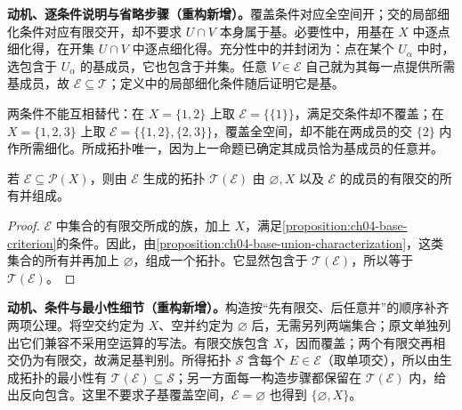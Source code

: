 \documentclass[../../main.tex]{subfiles}%
\begin{document}
\begin{remark}
\textbf{动机、逐条件说明与省略步骤（重构新增）。}覆盖条件对应全空间开；交的局部细化条件对应有限交开，却不要求 $U\cap V$ 本身属于基。必要性中，用基在 $X$ 中逐点细化得，在开集 $U\cap V$ 中逐点细化得。充分性中的并封闭为：点在某个 $U_\alpha$ 中时，选包含于 $U_\alpha$ 的基成员，它也包含于并集。任意 $V\in\mathcal E$ 自己就为其每一点提供所需基成员，故 $\mathcal E\subseteq\mathcal T$；定义中的局部细化条件随后证明它是基。

两条件不能互相替代：在 $X=\{1,2\}$ 上取 $\mathcal E=\{\{1\}\}$，满足交条件却不覆盖；在 $X=\{1,2,3\}$ 上取 $\mathcal E=\{\{1,2\},\{2,3\}\}$，覆盖全空间，却不能在两成员的交 $\{2\}$ 内作所需细化。所成拓扑唯一，因为上一命题已确定其成员恰为基成员的任意并。
\end{remark}
\begin{proposition}\label{proposition:ch04-subbase-construction}
若 $\mathcal E\subseteq\mathscr P(X)$，则由 $\mathcal E$ 生成的拓扑 $\mathcal T(\mathcal E)$ 由 $\varnothing,X$ 以及 $\mathcal E$ 的成员的有限交的所有并组成。
\end{proposition}
\begin{proof}
$\mathcal E$ 中集合的有限交所成的族，加上 $X$，满足\cref{proposition:ch04-base-criterion}的条件。因此，由\cref{proposition:ch04-base-union-characterization}，这类集合的所有并再加上 $\varnothing$，组成一个拓扑。它显然包含于 $\mathcal T(\mathcal E)$，所以等于 $\mathcal T(\mathcal E)$。
\end{proof}
\begin{remark}
\textbf{动机、条件与最小性细节（重构新增）。}构造按“先有限交、后任意并”的顺序补齐两项公理。将空交约定为 $X$、空并约定为 $\varnothing$ 后，无需另列两端集合；原文单独列出它们兼容不采用空运算的写法。有限交族包含 $X$，因而覆盖；两个有限交再相交仍为有限交，故满足基判别。所得拓扑 $\mathcal S$ 含每个 $E\in\mathcal E$（取单项交），所以由生成拓扑的最小性有 $\mathcal T(\mathcal E)\subseteq\mathcal S$；另一方面每一构造步骤都保留在 $\mathcal T(\mathcal E)$ 内，给出反向包含。这里不要求子基覆盖空间，$\mathcal E=\varnothing$ 也得到 $\{\varnothing,X\}$。
\end{remark}
\end{document}
